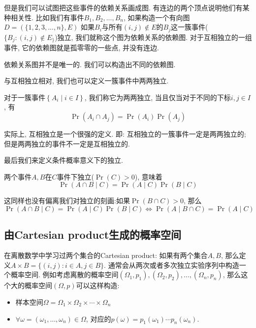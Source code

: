 \documentclass{ctexart}
\begin{document}
但是我们可以试图把这些事件的依赖关系画成图. 有连边的两个顶点说明他们有某种相关性. 比如我们有事件$B_1, B_2, ..., B_n$, 如果构造一个有向图$D=(\{ 1,2,3, ..., n \}, E)$
如果$B_i$与所有$(i,j)\notin E$的$B_j$这一簇事件($\{ B_j: (i,j)\notin E_ \}$)独立, 我们就称这个图为依赖关系的依赖图. 
对于互相独立的一组事件, 它的依赖图就是孤零零的一些点, 并没有连边. 

依赖关系图并不是唯一的. 我们可以构造出不同的依赖图. 

与互相独立相对, 我们也可以定义一簇事件中两两独立. 

\begin{definition}
    对于一簇事件$\left\{A_i \mid i \in I\right\}$, 我们称它为两两独立, 当且仅当对于不同的下标$i,j\in I$, 有
    $$\operatorname{Pr}\left(A_i \cap A_j\right)=\operatorname{Pr}\left(A_i\right) \operatorname{Pr}\left(A_j\right)$$
    
\end{definition}

实际上, 互相独立是一个很强的定义. 即: 互相独立的一簇事件一定是两两独立的; 但是两两独立的事件不一定是互相独立的. 

最后我们来定义条件概率意义下的独立. 

\begin{definition}[条件独立]
    两个事件$A, B$在$C$事件下独立($\Pr(C)>0$), 意味着
    $$\operatorname{Pr}(A \cap B \mid C)=\operatorname{Pr}(A \mid C) \operatorname{Pr}(B \mid C)$$
\end{definition}

这同样也没有偏离我们对独立的刻画:如果$\operatorname{Pr}(B \cap C)>0$, 那么$ \operatorname{Pr}(A \cap B \mid C)=\operatorname{Pr}(A \mid C) \operatorname{Pr}(B \mid C) \Longleftrightarrow \operatorname{Pr}(A \mid B \cap C)=\operatorname{Pr}(A \mid C)$ 

\subsection{由Cartesian product生成的概率空间}

在离散数学中学习过两个集合的Cartesian product: 如果有两个集合$A, B$, 那么定义$A \times B = \{ (i,j): i \in A, j \in B \}.$
通常会从两次或者多次独立实验序列中构造一个概率空间. 例如考虑离散的概率空间$\left(\Omega_1, p_1\right),\left(\Omega_2, p_2\right), \ldots,\left(\Omega_n, p_n\right)$, 那么这个大的概率空间$(\Omega, p)$可以这样构造:
\begin{itemize}
    \item 样本空间$\Omega=\Omega_1 \times \Omega_2 \times \cdots \times \Omega_n$
    \item $\forall \omega=\left(\omega_1, \ldots, \omega_n\right) \in \Omega$, 对应的$p(\omega)=p_1\left(\omega_1\right) \cdots p_n\left(\omega_n\right)$. 
\end{itemize}
\end{document}
